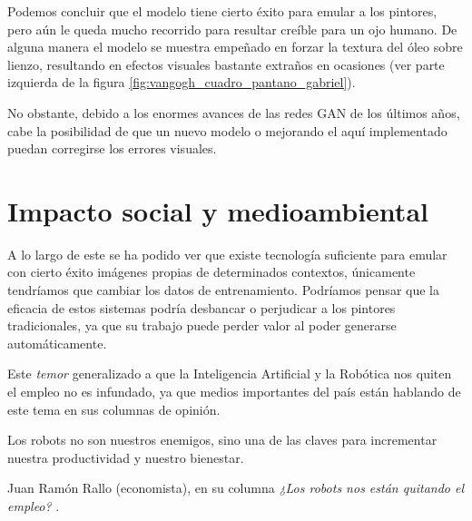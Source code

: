 \documentclass[../main.tex]{subfiles}
\begin{document}
Podemos concluir que el modelo tiene cierto éxito para emular a los pintores, pero aún le queda mucho recorrido para resultar creíble para un ojo humano. De alguna manera el modelo se muestra empeñado en forzar la textura del óleo sobre lienzo, resultando en efectos visuales bastante extraños en ocasiones (ver parte izquierda de la figura \ref{fig:vangogh_cuadro_pantano_gabriel}). \newline

No obstante, debido a los enormes avances de las redes GAN de los últimos años, cabe la posibilidad de que un nuevo modelo o mejorando el aquí implementado puedan corregirse los errores visuales.

\newpage

\section{Impacto social y medioambiental}

A lo largo de este \tfg se ha podido ver que existe tecnología suficiente para emular con cierto éxito imágenes propias de determinados contextos, únicamente tendríamos que cambiar los datos de entrenamiento. Podríamos pensar que la eficacia de estos sistemas podría desbancar o perjudicar a los pintores tradicionales, ya que su trabajo puede perder valor al poder generarse automáticamente. \newline

Este \textit{temor} generalizado a que la Inteligencia Artificial y la Robótica nos quiten el empleo no es infundado, ya que medios importantes del país están hablando de este tema en sus columnas de opinión.

\begin{center}
    \begin{minipage}{0.9\linewidth}
        \vspace{5pt}%
        {\small
            Los robots no son nuestros enemigos, sino una de las claves para incrementar nuestra productividad y nuestro bienestar.
        }
        \begin{flushright}
            Juan Ramón Rallo (economista), en su columna \textit{¿Los robots nos están quitando el empleo?} \cite{RamonRallo2019}.
        \end{flushright}
        \vspace{3pt}%
    \end{minipage}
\end{center}
\end{document}

